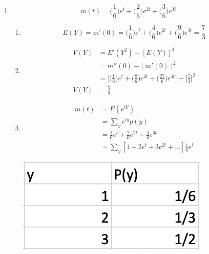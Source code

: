 \documentclass[13pt]{article}
\begin{document}
\begin{enumerate}[label=(\alph*)]
\item \[m(t) = \bigg(\frac{1}{6}\bigg)e^{t} +
    \bigg(\frac{2}{6}\bigg)e^{2t} + \bigg(\frac{3}{6}\bigg)e^{3t}\]
  \begin{enumerate}[label=(\textit{\roman*})]
  \item \[E(Y) = m'(0) = \bigg(\frac{1}{6}\bigg)e^{t} +
      \bigg(\frac{4}{6}\bigg)e^{2t} + \bigg(\frac{9}{6}\bigg)e^{3t} = \frac{7}{3}\]
  \item
    \begin{align*}
      V(Y) &= E'(Y^{2}) - [E(Y)]^{2} \\
           &= m''(0) - [m'(0)]^{2} \\
           &= \bigg[\bigg(\frac{1}{6}\bigg)e^{t} +
             \bigg(\frac{8}{6}\bigg)e^{2t} +
             \bigg(\frac{27}{6}\bigg)e^{3t}\bigg] -
             \bigg[\frac{7}{3}\bigg]^2 \\
      V(Y) &= \frac{5}{9}
    \end{align*}
  \item
    \begin{align*}
      m(t) &= E(e^{tY}) \\
           &= \sum_{y}  e^{ty}p(y) \\
             &= \frac{1}{6}e^{t} + \frac{2}{6}e^{2t} +
               \frac{3}{6}e^{3t} \\
           &= \sum_{y} [1 + 2e^t + 3e^{2t} + \ldots] \frac{1}{6}e^{t}
    \end{align*}
    \begin{center}
      \includegraphics[scale=1]{images/fractions.png}
    \end{center}    
  \end{enumerate}
\end{enumerate}

\newpage
\end{document}
